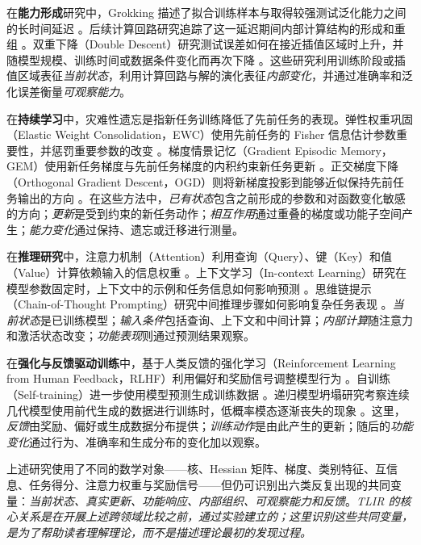 在\textbf{能力形成}研究中，Grokking 描述了拟合训练样本与取得较强测试泛化能力之间的长时间延迟 \cite{power2022}。后续计算回路研究追踪了这一延迟期间内部计算结构的形成和重组 \cite{nanda2023}。双重下降（Double Descent）研究测试误差如何在接近插值区域时上升，并随模型规模、训练时间或数据条件变化而再次下降 \cite{belkin2019,nakkiran2020}。这些研究利用训练阶段或插值区域表征\emph{当前状态}，利用计算回路与解的演化表征\emph{内部变化}，并通过准确率和泛化误差衡量\emph{可观察能力}。

在\textbf{持续学习}中，灾难性遗忘是指新任务训练降低了先前任务的表现。弹性权重巩固（Elastic Weight Consolidation，EWC）使用先前任务的 Fisher 信息估计参数重要性，并惩罚重要参数的改变 \cite{kirkpatrick2017}。梯度情景记忆（Gradient Episodic Memory，GEM）使用新任务梯度与先前任务梯度的内积约束新任务更新 \cite{lopezpaz2017}。正交梯度下降（Orthogonal Gradient Descent，OGD）则将新梯度投影到能够近似保持先前任务输出的方向 \cite{farajtabar2020}。在这些方法中，\emph{已有状态}包含之前形成的参数和对函数变化敏感的方向；\emph{更新}是受到约束的新任务动作；\emph{相互作用}通过重叠的梯度或功能子空间产生；\emph{能力变化}通过保持、遗忘或迁移进行测量。

在\textbf{推理研究}中，注意力机制（Attention）利用查询（Query）、键（Key）和值（Value）计算依赖输入的信息权重 \cite{vaswani2017}。上下文学习（In-context Learning）研究在模型参数固定时，上下文中的示例和任务信息如何影响预测 \cite{brown2020}。思维链提示（Chain-of-Thought Prompting）研究中间推理步骤如何影响复杂任务表现 \cite{wei2022}。\emph{当前状态}是已训练模型；\emph{输入条件}包括查询、上下文和中间计算；\emph{内部计算}随注意力和激活状态改变；\emph{功能表现}则通过预测结果观察。

在\textbf{强化与反馈驱动训练}中，基于人类反馈的强化学习（Reinforcement Learning from Human Feedback，RLHF）利用偏好和奖励信号调整模型行为 \cite{ouyang2022}。自训练（Self-training）进一步使用模型预测生成训练数据 \cite{xie2020}。递归模型坍塌研究考察连续几代模型使用前代生成的数据进行训练时，低概率模态逐渐丧失的现象 \cite{shumailov2024}。这里，\emph{反馈}由奖励、偏好或生成数据分布提供；\emph{训练动作}是由此产生的更新；随后的\emph{功能变化}通过行为、准确率和生成分布的变化加以观察。

上述研究使用了不同的数学对象——核、Hessian 矩阵、梯度、类别特征、互信息、任务得分、注意力权重与奖励信号——但仍可识别出六类反复出现的共同变量：\emph{当前状态、真实更新、功能响应、内部组织、可观察能力和反馈}。\emph{TLIR 的核心关系是在开展上述跨领域比较之前，通过实验建立的；这里识别这些共同变量，是为了帮助读者理解理论，而不是描述理论最初的发现过程。}

